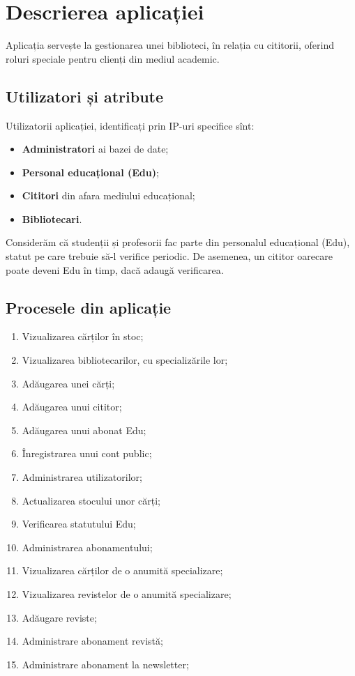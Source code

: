 
\chapter{Descrierea aplicației}

Aplicația servește la gestionarea unei biblioteci, în relația cu cititorii,
oferind roluri speciale pentru clienți din mediul academic.

\section{Utilizatori și atribute}
\label{sec:util-atr}

Utilizatorii aplicației, identificați prin IP-uri specifice sînt:
\begin{itemize}
\item \textbf{Administratori} ai bazei de date;
\item \textbf{Personal educațional (Edu)};
\item \textbf{Cititori} din afara mediului educațional;
\item \textbf{Bibliotecari}.
\end{itemize}

Considerăm că studenții și profesorii fac parte din personalul educațional
(Edu), statut pe care trebuie să-l verifice periodic. De asemenea, un
cititor oarecare poate deveni Edu în timp, dacă adaugă verificarea.

\section{Procesele din aplicație}
\label{sec:procese}

\begin{enumerate}[(P1)]
\item Vizualizarea cărților în stoc;
\item Vizualizarea bibliotecarilor, cu specializările lor;
\item Adăugarea unei cărți;
\item Adăugarea unui cititor;
\item Adăugarea unui abonat Edu;
\item Înregistrarea unui cont public;
\item Administrarea utilizatorilor;
\item Actualizarea stocului unor cărți;
\item Verificarea statutului Edu;
\item Administrarea abonamentului;
\item Vizualizarea cărților de o anumită specializare;
\item Vizualizarea revistelor de o anumită specializare;
\item Adăugare reviste;
\item Administrare abonament revistă;
\item Administrare abonament la newsletter;
\end{enumerate}

